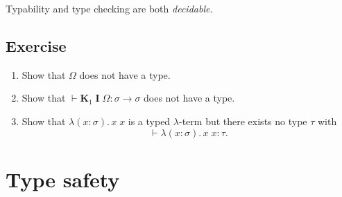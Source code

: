 \begin{theorem}
  Typability and type checking are both \emph{decidable}.
\end{theorem}

\subsection*{Exercise}
\begin{enumerate}
  \item Show that $\Omega$ does not have a type.
  \item Show that $\vdash \mathbf{K}_1\;\mathbf{I}\;\Omega : \sigma \to \sigma$
    does not have a type.
  \item Show that $\lambda (x : \sigma).\, x\; x$ is a typed $\lambda$-term but
    there exists no type $\tau$ with 
    \[
      \vdash \lambda (x : \sigma).\, x\; x : \tau.
    \]
  \end{enumerate}
\section{Type safety}
